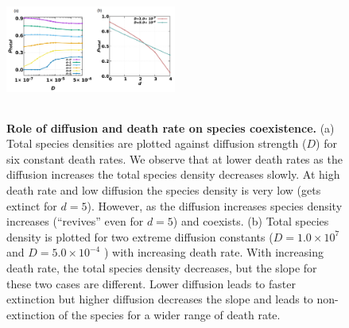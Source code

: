 \documentclass[aps, pre, twocolumn, amsmath, superscriptaddress,showkeys,showpacs]{revtex4-1}
\begin{document}

	
		\begin{figure}
		\includegraphics[width=0.5\textwidth, height=4.5cm]{Diagram2.png}
		\caption{{\bf Role of diffusion and death rate on species coexistence.} (a) Total species densities are plotted against diffusion strength ($D$) for six constant death rates. We observe that at lower death rates as the diffusion increases the total species density decreases slowly. At high death rate and low diffusion the species density is very low (gets extinct for $d=5$). However, as the diffusion increases species density increases (``revives'' even for $d=5$) and coexists. 
			(b) Total species density is plotted for two extreme diffusion constants ($ D=1.0\times 10^{7}$ and $ D=5.0\times 10^{-4}$ ) with increasing death rate. With increasing death rate, the total species density decreases, but the slope for these two cases are different. Lower diffusion leads to faster extinction but higher diffusion decreases the slope and leads to non-extinction of the species for a wider range of death rate.}
		\label{fig2-speciesdensity}
	\end{figure}
\end{document}
